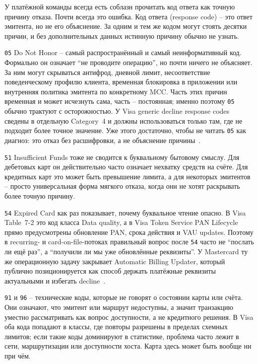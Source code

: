 У платёжной команды всегда есть соблазн прочитать код ответа как
точную причину отказа. Почти всегда это ошибка. Код ответа
(response code) -- это ответ эмитента, но не его объяснение. За одним
и тем же кодом могут стоять десятки причин, и без дополнительных
данных истинную причину обычно не узнать.

\texttt{05} Do Not Honor -- самый распространённый и самый неинформативный
код. Формально он означает \enquote{не проводите операцию}, но почти ничего не
объясняет. За ним могут скрываться антифрод, дневной лимит, несоответствие
поведенческому профилю клиента, временная блокировка в приложении или
внутренняя политика эмитента по конкретному MCC. Часть этих причин
временная и может исчезнуть сама, часть -- постоянная; именно поэтому
\texttt{05} обычно трактуют с осторожностью. У Visa generic decline
response codes сведены в отдельную Category~4 и должны использоваться
только там, где не подходит более точное значение. Уже этого достаточно,
чтобы не читать \texttt{05} как диагноз: это отказ без расшифровки, а не
объяснение причины~\cite{visa-core-rules}.

\texttt{51} Insufficient Funds тоже не сводится к буквальному бытовому
смыслу. Для дебетовых карт он действительно часто означает нехватку
средств на счёте. Для кредитных карт это может быть превышение лимита,
а для некоторых эмитентов -- просто универсальная форма мягкого
отказа, когда они не хотят раскрывать более точную причину.

\texttt{54} Expired Card как раз показывает, почему буквальное чтение опасно.
В Visa Table~7-2 это код класса Data quality, а в Visa Token Service
PAN Lifecycle прямо предусмотрены обновление PAN, срока действия и VAU
updates. Поэтому в recurring- и card-on-file-потоках правильный вопрос
после \texttt{54} часто не \enquote{послать ли ещё раз}, а
\enquote{получили ли мы уже обновлённые реквизиты}. У Mastercard ту же
операционную задачу закрывает Automatic Billing Updater, который
публично позиционируется как способ держать платёжные реквизиты
актуальными
и избегать decline~\cite{visa-core-rules}\cite{visa-vts}\cite{visa-vau}\cite{mc-bill-pay-solutions}.

\texttt{91} и \texttt{96} -- технические коды, которые не говорят о состоянии
карты или счёта. Они означают, что эмитент или маршрут недоступны, а
значит транзакцию уместно рассматривать как вопрос доступности, а не
кредитного решения. В Visa оба кода попадают в классы, где
повторы разрешены в пределах схемных лимитов; если такие коды
доминируют в статистике, проблема часто лежит в сети,
маршрутизации или доступности хоста. Карта здесь может быть вообще ни при чём.
\cite{visa-core-rules}

